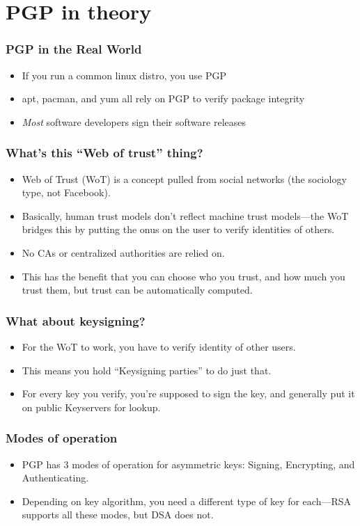 \documentclass[aspectratio=1610,bigger,utf8]{beamer}
\begin{document}
\section{PGP in theory}
\begin{frame}
	\frametitle{PGP in the Real World}
	\begin{itemize}
		\item If you run a common linux distro, you use PGP
		\item apt, pacman, and yum all rely on PGP to verify package
			integrity
		\item \emph{Most} software developers sign their software
			releases
	\end{itemize}
\end{frame}
\begin{frame}
	\frametitle{What's this ``Web of trust'' thing?}
	\begin{itemize}
		\item Web of Trust (WoT) is a concept pulled from social
			networks (the sociology type, not Facebook).
		\item Basically, human trust models don't reflect machine trust
			models---the WoT bridges this by putting the onus on
			the user to verify identities of others.
		\item No CAs or centralized authorities are relied on.
		\item This has the benefit that you can choose who you trust,
			and how much you trust them, but trust can be
			automatically computed.
	\end{itemize}
\end{frame}
\begin{frame}
	\frametitle{What about keysigning?}
	\begin{itemize}
		\item For the WoT to work, you have to verify identity of other
			users.
		\item This means you hold ``Keysigning parties'' to do just that.
		\item For every key you verify, you're supposed to sign the
			key, and generally put it on public \alert{Keyservers}
			for lookup.
	\end{itemize}
\end{frame}
\begin{frame}
	\frametitle{Modes of operation}
	\begin{itemize}
		\item PGP has 3 modes of operation for asymmetric keys: Signing,
			Encrypting, and Authenticating.
		\item Depending on key algorithm, you need a different type of
			key for each---RSA supports all these modes, but DSA
			does not.
	\end{itemize}
\end{frame}
\end{document}
